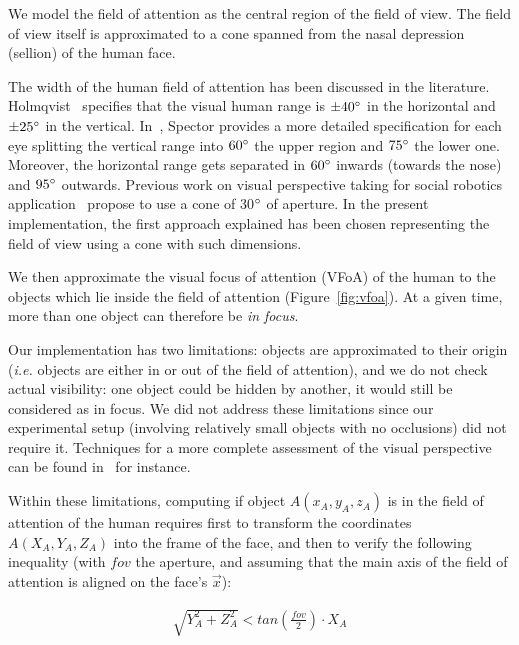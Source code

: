 \documentclass{sig-alternate}
\newcommand{\ie}{\textit{i.e.}\xspace}
\begin{document}
We model the field of attention as the central region of the field of view.
The field of view itself is approximated to a cone spanned from the nasal
depression (sellion) of the human face.

The width of the human field of attention has been discussed in the literature.
Holmqvist~\cite{holmqvist2011eye} specifies that the visual human
range is $ \pm  40\degree $ in the
horizontal and $ \pm 25\degree $ in the vertical.
In~\cite{walker1980clinical}, Spector provides a more detailed specification
for each eye splitting the vertical range into $ 60\degree $ the upper region
and $ 75\degree $ the lower one. Moreover, the horizontal range gets separated
in $ 60\degree $ inwards (towards the nose) and $ 95\degree $ outwards.
Previous work on visual perspective taking for social robotics
application~\cite{sisbot2011situation} propose to use a cone of 30$\degree$ of
aperture. In the present implementation, the first approach explained has been
chosen representing the field of view using a cone with such
dimensions.

We then approximate the visual focus of attention (VFoA) of the human to the
objects which lie inside the field of attention (Figure~\ref{fig:vfoa}). At a
given time, more than one object can therefore be \emph{in focus}.

Our implementation has two limitations: objects are approximated to their origin
(\ie objects are either in or out of the field of attention), and we do not
check actual visibility: one object could be hidden by another, it would still
be considered as in focus. We did not address these limitations since our
experimental setup (involving relatively small objects with no occlusions) did
not require it. Techniques for a more complete assessment of the visual
perspective can be found in~\cite{sisbot2011situation} for instance.

Within these limitations, computing if object $A(x_A,y_A,z_A)$ is in the field
of attention of the human requires first to transform the coordinates
$A(X_A,Y_A,Z_A)$ into the frame of the face, and then to verify the following
inequality (with $fov$ the aperture, and assuming that the main axis of the
field of attention is aligned on the face's $\vec{x}$):

\begin{align}
    \sqrt{Y_A^2 + Z_A^2} < tan\left(\frac{fov}{2}\right) \cdot X_A
\label{eq:fov}
\end{align}
\end{document}
